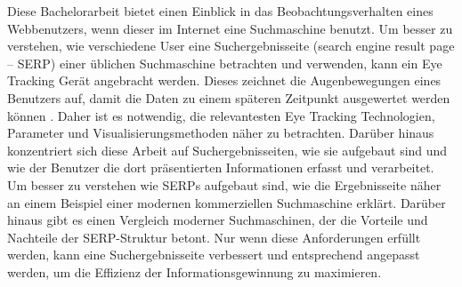 Diese Bachelorarbeit bietet einen Einblick in das Beobachtungsverhalten eines Webbenutzers, wenn dieser im Internet eine Suchmaschine benutzt. Um besser zu verstehen, wie verschiedene User eine Suchergebnisseite (search engine result page -- SERP) einer üblichen Suchmaschine betrachten und verwenden, kann ein Eye Tracking Gerät angebracht werden. Dieses zeichnet die Augenbewegungen eines Benutzers auf, damit die Daten zu einem späteren Zeitpunkt ausgewertet werden können \autocite{liu2015influence}. Daher ist es notwendig, die relevantesten Eye Tracking Technologien, Parameter und Visualisierungsmethoden näher zu betrachten. Darüber hinaus konzentriert sich diese Arbeit auf Suchergebnisseiten, wie sie aufgebaut sind und wie der Benutzer die dort präsentierten Informationen erfasst und verarbeitet.
Um besser zu verstehen wie SERPs aufgebaut sind, wie die Ergebnisseite näher an einem Beispiel einer modernen kommerziellen Suchmaschine erklärt.
Darüber hinaus gibt es einen Vergleich moderner Suchmaschinen, der die Vorteile und Nachteile der SERP-Struktur betont.
Nur wenn diese Anforderungen erfüllt werden, kann eine Suchergebnisseite verbessert und entsprechend angepasst werden, um die Effizienz der Informationsgewinnung zu maximieren.
